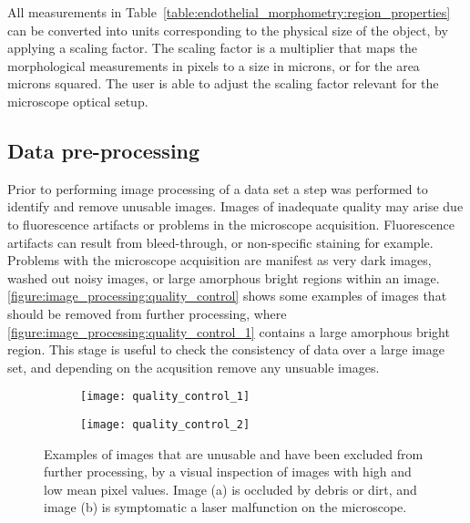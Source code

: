 All measurements in Table~\ref{table:endothelial_morphometry:region_properties} can be converted into units corresponding to the physical size of the object, by applying a scaling factor. The scaling factor is a multiplier that maps the morphological measurements in pixels to a size in microns, or for the area microns squared. The user is able to adjust the scaling factor relevant for the microscope optical setup.

\subsection{Data pre-processing}
\label{endothelial_morphometry:image_processing:data_preprocessing}
Prior to performing image processing of a data set a step was performed to identify and remove unusable images. Images of inadequate quality may arise due to fluorescence artifacts or problems in the microscope acquisition. Fluorescence artifacts can result from bleed-through, or non-specific staining for example. Problems with the microscope acquisition are manifest as very dark images, washed out noisy images, or large amorphous bright regions within an image. \autoref{figure:image_processing:quality_control} shows some examples of images that should be removed from further processing, where \autoref{figure:image_processing:quality_control_1} contains a large amorphous bright region. This stage is useful to check the consistency of data over a large image set, and depending on the acqusition remove any unsuable images.

\begin{figure}[htbp]\centering
	\begin{subfigure}[b]{0.49\linewidth} %
		\centering
		\texttt{[image: quality\_control\_1]}
		\caption{}
		\label{figure:image_processing:quality_control_1}
		\vspace{1ex} \end{subfigure} \begin{subfigure}[b]{0.49\linewidth} %
		\centering
		\texttt{[image: quality\_control\_2]}
		\caption{}
		\label{figure:image_processing:quality_control_2}
		\vspace{1ex}
	\end{subfigure}
\caption[Examples of images excluded from high-throughput analysis]{Examples of images that are unusable and have been excluded from further processing, by a visual inspection of images with high and low mean pixel values. Image (a) is occluded by debris or dirt, and image (b) is symptomatic a laser malfunction on the microscope.}
\label{figure:image_processing:quality_control}
\end{figure}

